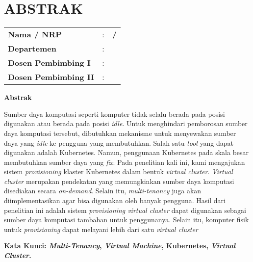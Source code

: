 \chapter*{ABSTRAK}


\vspace{2ex}

\begin{center}
  \large\textbf{\tatitle{}}
\end{center}

\vspace{2ex}

\begingroup
\setlength{\tabcolsep}{0pt}

\noindent
\begin{tabularx}{\textwidth}{l >{\centering}m{2em} X}
  \textbf{Nama / NRP}           & : & \textbf{\name{} / \nrp{}} \\
  \textbf{Departemen}           & : & \textbf{\department{}}    \\
  \textbf{Dosen Pembimbing I}   & : & \textbf{\advisor{}}       \\
  \textbf{Dosen Pembimbing II}  & : & \textbf{\coadvisor{}}     \\
\end{tabularx}
\endgroup

\noindent
\textbf{Abstrak}

Sumber daya komputasi seperti komputer tidak selalu berada
pada posisi digunakan atau berada pada posisi \emph{idle}.
Untuk menghindari pemborosan sumber daya komputasi tersebut,
dibutuhkan mekanisme untuk menyewakan sumber daya yang \emph{idle}
ke pengguna yang membutuhkan. Salah satu \emph{tool} yang
dapat digunakan adalah Kubernetes. Namun, penggunaan Kubernetes
pada skala besar membutuhkan sumber daya yang \emph{fix}. Pada
penelitian kali ini, kami mengajukan sistem \emph{provisioning}
klaster Kubernetes dalam bentuk \emph{virtual cluster}. \emph{Virtual cluster}
merupakan pendekatan yang memungkinkan sumber daya komputasi disediakan secara
\emph{on-demand}. Selain itu, \emph{multi-tenancy} juga akan diimplementasikan
agar bisa digunakan oleh banyak pengguna. Hasil dari penelitian ini
adalah sistem \emph{provisioning virtual cluster} dapat digunakan sebagai
sumber daya komputasi tambahan untuk penggunanya. Selain itu, komputer fisik
untuk \emph{provisioning} dapat melayani lebih dari satu \emph{virtual cluster}

\vspace{2ex}
\noindent
\textbf{Kata Kunci: \emph{Multi-Tenancy}, \emph{Virtual Machine}, Kubernetes, \emph{Virtual Cluster}.}
